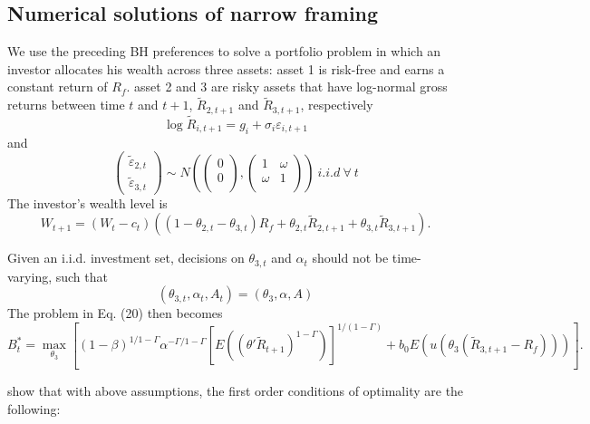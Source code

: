 \documentclass[ukenglish,nottitlepage,thmsb,11pt,letterpaper]{article}
\begin{document}
\subsection{Numerical solutions of narrow framing}
We use the preceding BH preferences to solve a portfolio problem in which an investor allocates his wealth across three assets: asset 1 is risk-free and earns a constant return of $R_f$. asset 2 and 3 are risky assets that have log-normal gross returns between time $t$ and $t+1$, $\widetilde{R}_{2,t+1}$ and  $\widetilde{R}_{3,t+1}$, respectively
\begin{equation*}
\log\widetilde{R}_{i,t+1} = g_i + \sigma_i \varepsilon_{i,t+1}
\end{equation*}
and
\begin{equation}
\left(
\begin{array}{ccc}
\widetilde{\varepsilon}_{2,t}\\
\widetilde{\varepsilon}_{3,t}
\end{array}
\right)
\sim N
\left( \left(
\begin{array}{ccc}
0\\
0\\
\end{array}
\right)
,
\left(
\begin{array}{ccc}
1 & \omega\\
\omega & 1\\
\end{array}
\right)  \right) \ i.i.d \ \forall \  t
\end{equation}
The investor's wealth level is
\begin{equation}
W_{t+1} = (W_t -c_t) \left((1-\theta_{2,t} - \theta_{3,t}) R_f + \theta_{2,t} \widetilde{R}_{2,t+1} + \theta_{3,t}  \widetilde{R}_{3,t+1}\right).
\end{equation}

Given an i.i.d. investment set, decisions on $\theta _{3,t}$ and $\alpha_t$ should not be time-varying, such that
\begin{equation*}
(\theta_{3,t}, \alpha_t, A_t) = (\theta_3, \alpha, A)
\end{equation*}
The problem in Eq. (20) then becomes
\begin{equation}
B^*_{t} = \underset {\theta_3}{\max} \left[ (1-\beta)^{1/1-\Gamma} \alpha^{-\Gamma/ 1-\Gamma} [E((\theta' \widetilde{R}_{t+1})^{1-\Gamma})]^{1/(1-\Gamma)}  +  b_0 E ( u(\theta_{3} (\widetilde{R}_{3,t+1} - R_f) )) \right].
\end{equation}

\citet{Barberis2009} show that with above assumptions, the first order conditions of optimality are the following:
\end{document}
